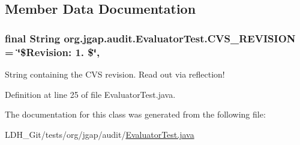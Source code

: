\subsection{Member Data Documentation}
\hypertarget{classorg_1_1jgap_1_1audit_1_1_evaluator_test_a80d23279c5dcd7d32bcaa415c5ca9783}{
\subsubsection[{C\-V\-S\-\_\-\-R\-E\-V\-I\-S\-I\-O\-N}]{\setlength{\rightskip}{0pt plus 5cm}final String org.\-jgap.\-audit.\-Evaluator\-Test.\-C\-V\-S\-\_\-\-R\-E\-V\-I\-S\-I\-O\-N = \char`\"{}\$Revision\-: 1. \$\char`\"{}\hspace{0.3cm}{\ttfamily [static]}, {\ttfamily [private]}}}\label{classorg_1_1jgap_1_1audit_1_1_evaluator_test_a80d23279c5dcd7d32bcaa415c5ca9783}
String containing the C\-V\-S revision. Read out via reflection! 

Definition at line 25 of file Evaluator\-Test.\-java.



The documentation for this class was generated from the following file\-:\begin{DoxyCompactItemize}
\item 
L\-D\-H\-\_\-\-Git/tests/org/jgap/audit/\hyperlink{_evaluator_test_8java}{Evaluator\-Test.\-java}\end{DoxyCompactItemize}
